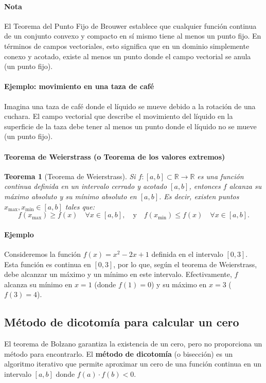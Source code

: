 \documentclass[12pt, a4paper]{article}
\theoremstyle{rioplatense}
\newtheorem{teorema}{Teorema}[section]
\begin{document}
\paragraph{Nota}
El Teorema del Punto Fijo de Brouwer establece que cualquier función continua de un conjunto convexo y compacto en sí mismo tiene al menos un punto fijo. En términos de campos vectoriales, esto significa que en un dominio simplemente conexo y acotado, existe al menos un punto donde el campo vectorial se anula (un punto fijo).

\paragraph{Ejemplo: movimiento en una taza de café}
Imagina una taza de café donde el líquido se mueve debido a la rotación de una cuchara. El campo vectorial que describe el movimiento del líquido en la superficie de la taza debe tener al menos un punto donde el líquido no se mueve (un punto fijo).

\paragraph{Teorema de Weierstrass (o Teorema de los valores extremos)}
\begin{teorema}[Teorema de Weierstrass]
Si \(f: [a, b] \subset \mathbb{R} \to \mathbb{R}\) es una función continua definida en un intervalo cerrado y acotado \([a, b]\), entonces \(f\) alcanza su máximo absoluto y su mínimo absoluto en \([a, b]\). Es decir, existen puntos \(x_{\max}, x_{\min} \in [a, b]\) tales que:
\[
f(x_{\max}) \geq f(x) \quad \forall x \in [a, b], \quad \text{y} \quad f(x_{\min}) \leq f(x) \quad \forall x \in [a, b].
\]
\end{teorema}


\paragraph{Ejemplo}
Consideremos la función \(f(x) = x^2 - 2x + 1\) definida en el intervalo \([0, 3]\). Esta función es continua en \([0, 3]\), por lo que, según el teorema de Weierstrass, debe alcanzar un máximo y un mínimo en este intervalo. Efectivamente, \(f\) alcanza su mínimo en \(x = 1\) (donde \(f(1) = 0\)) y su máximo en \(x = 3\) (\(f(3) = 4\)).

\subsection{Método de dicotomía para calcular un cero}
El teorema de Bolzano garantiza la existencia de un cero, pero no proporciona un método para encontrarlo. El \textbf{método de dicotomía} (o bisección) es un algoritmo iterativo que permite aproximar un cero de una función continua en un intervalo $[a, b]$ donde $f(a) \cdot f(b) < 0$.
\end{document}

